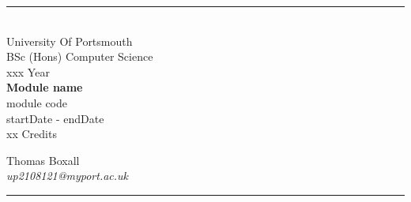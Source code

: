 \documentclass[a4paper, 11pt]{report}
\begin{document}
\begin{titlepage}
    \rule{\textwidth}{1px}
    \vspace{0.025\textheight}\\
    \huge{University Of Portsmouth}\\
    \huge{BSc (Hons) Computer Science}\\
    \huge{xxx Year}\\
    \vfill
    \LARGE{\textbf{Module name}}\\
    \Large{module code}\\
    \large{startDate - endDate}\\
    \large{xx Credits}
    \vfill

    
    \begin{FlushRight}
        \large{Thomas Boxall}\\
        \textit{up2108121@myport.ac.uk}\\
        
    \end{FlushRight}
    \vspace{0.2\textheight}
    \rule{\textwidth}{1px}
    
\end{titlepage}

\tableofcontents

\end{document}
